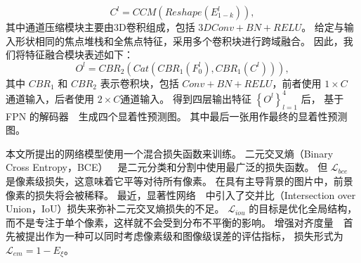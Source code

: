 %
%
\begin{equation}
	C^{l} = CCM \left ( Reshape \left ( E_{1-k}^{l} \right ) \right ) ,
\end{equation}
%
%
其中通道压缩模块主要由3D卷积组成，包括 $3DConv+BN+RELU$。 给定与输入形状相同的焦点堆栈和全焦点特征，采用多个卷积块进行跨域融合。 因此，我们将特征融合模块表述如下：
%
%
%	
\begin{equation}
	O^{l}=CBR_{2}\left (Cat \left (CBR_{1} \left (F_{0}^{l} \right ),CBR_{1} \left (C^{l} \right ) \right ) \right ),
\end{equation}
%
%
其中 $CBR_{1}$ 和 $CBR_{2}$ 表示卷积块，包括 $Conv+BN+RELU$，前者使用 $1 \times C$ 通道输入，后者使用 $2 \times C$通道输入。
得到四层输出特征 $\left \{ O^{l} \right \}_{l=1}^{4} $ 后， 基于 FPN 的解码器~\cite{lin2017feature}~生成四个显着性预测图。 
其中最后一张用作最终的显着性预测图。 
%
%
%
%
%








%
%
本文所提出的网络模型使用一个混合损失函数来训练。
%
%
二元交叉熵（Binary Cross Entropy，BCE）~\cite{de2005tutorial}~是二元分类和分割中使用最广泛的损失函数。 但 $\mathcal L_{bce} $ 是像素级损失，这意味着它平等对待所有像素。
在具有主导背景的图片中，前景像素的损失将会被稀释。 最近，显著性网络~\cite{qin2019basnet}~中引入了交并比（Intersection over Union，IoU）损失来弥补二元交叉熵损失的不足。
$ \mathcal L_{iou} $ 的目标是优化全局结构，而不是专注于单个像素，这样就不会受到分布不平衡的影响。 增强对齐度量~\cite{fan2018enhanced}~首先被提出作为一种可以同时考虑像素级和图像级误差的评估指标，
损失形式为 $ \mathcal L_{em} = 1 - E_{\xi} $。 

